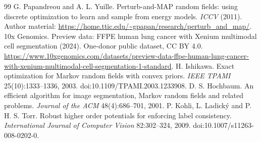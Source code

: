 \documentclass[10pt,letterpaper]{article}
\begin{document}
\begin{thebibliography}{99}
 G. Papandreou and A. L. Yuille. Perturb-and-MAP random fields: using discrete optimization to learn and sample from energy models. \emph{ICCV} (2011). Author material: \url{https://home.ttic.edu/~gpapan/research/perturb_and_map/}.
 10x Genomics. Preview data: FFPE human lung cancer with Xenium multimodal cell segmentation (2024). One-donor public dataset, CC BY 4.0. \url{https://www.10xgenomics.com/datasets/preview-data-ffpe-human-lung-cancer-with-xenium-multimodal-cell-segmentation-1-standard}.
 H. Ishikawa. Exact optimization for Markov random fields with convex priors. \emph{IEEE TPAMI} 25(10):1333--1336, 2003. doi:10.1109/TPAMI.2003.1233908.
 D. S. Hochbaum. An efficient algorithm for image segmentation, Markov random fields and related problems. \emph{Journal of the ACM} 48(4):686--701, 2001.
 P. Kohli, L. Ladick\'{y} and P. H. S. Torr. Robust higher order potentials for enforcing label consistency. \emph{International Journal of Computer Vision} 82:302--324, 2009. doi:10.1007/s11263-008-0202-0.
\end{thebibliography}
\end{document}
